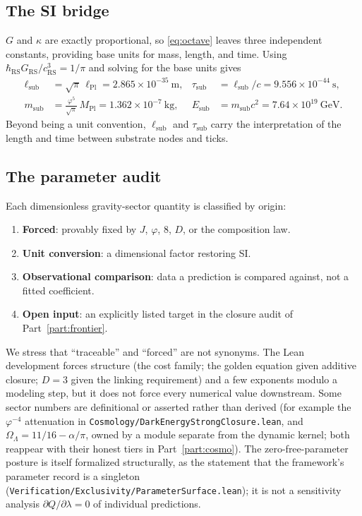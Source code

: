 \documentclass[11pt,letterpaper]{article}
\newcommand{\lean}[1]{\texttt{#1}}
\begin{document}
\subsection{The SI bridge}

$G$ and $\kappa$ are exactly proportional, so \eqref{eq:octave} leaves three independent constants, providing base units for mass, length, and time. Using $\hbar_{\mathrm{RS}}G_{\mathrm{RS}}/c_{\mathrm{RS}}^{3}=1/\pi$ and solving for the base units gives
\begin{align}
\ell_{\mathrm{sub}}&=\sqrt{\pi}\,\ell_{\mathrm{Pl}}=2.865\times 10^{-35}\ \mathrm{m}, &
\tau_{\mathrm{sub}}&=\ell_{\mathrm{sub}}/c=9.556\times 10^{-44}\ \mathrm{s},
\label{eq:si1}\\
m_{\mathrm{sub}}&=\frac{\varphi^{5}}{\sqrt{\pi}}\,M_{\mathrm{Pl}}=1.362\times 10^{-7}\ \mathrm{kg}, &
E_{\mathrm{sub}}&=m_{\mathrm{sub}}c^{2}=7.64\times 10^{19}\ \mathrm{GeV}.
\label{eq:si2}
\end{align}
Beyond being a unit convention, $\ell_{\mathrm{sub}}$ and $\tau_{\mathrm{sub}}$ carry the interpretation of the length and time between substrate nodes and ticks.

\subsection{The parameter audit}
\label{sec:audit}

Each dimensionless gravity-sector quantity is classified by origin:
\begin{enumerate}
\item \textbf{Forced}: provably fixed by $J$, $\varphi$, $8$, $D$, or the composition law.
\item \textbf{Unit conversion}: a dimensional factor restoring SI.
\item \textbf{Observational comparison}: data a prediction is compared against, not a fitted coefficient.
\item \textbf{Open input}: an explicitly listed target in the closure audit of Part~\ref{part:frontier}.
\end{enumerate}
We stress that ``traceable'' and ``forced'' are not synonyms. The Lean development forces structure (the cost family; the golden equation given additive closure; $D=3$ given the linking requirement) and a few exponents modulo a modeling step, but it does not force every numerical value downstream. Some sector numbers are definitional or asserted rather than derived (for example the $\varphi^{-4}$ attenuation in \lean{Cosmology/DarkEnergyStrongClosure.lean}, and $\Omega_{\Lambda}=11/16-\alpha/\pi$, owned by a module separate from the dynamic kernel; both reappear with their honest tiers in Part~\ref{part:cosmo}). The zero-free-parameter posture is itself formalized structurally, as the statement that the framework's parameter record is a singleton (\lean{Verification/Exclusivity/ParameterSurface.lean}); it is not a sensitivity analysis $\partial Q/\partial\lambda=0$ of individual predictions.
\end{document}
